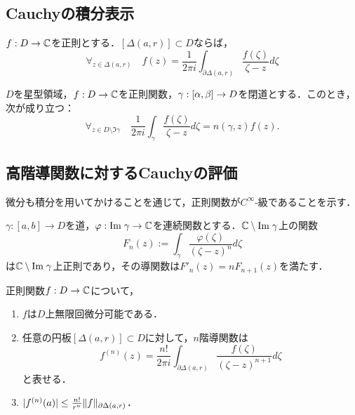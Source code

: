 \documentclass[uplatex, dvipdfmx]{jsreport}
\begin{document}
\subsection{Cauchyの積分表示}

\begin{theorem}[閉円板に対するCauchyの積分表示]
    $f:D\to\mathbb{C}$を正則とする．$[\Delta(a,r)]\subset D$ならば，
    \[\forall_{z\in\Delta(a,r)}\quad f(z)=\frac{1}{2\pi i}\int_{\partial\Delta(a,r)}\frac{f(\zeta)}{\zeta-z}d\zeta\]
\end{theorem}

\begin{theorem}[一般の曲線に対するCauchyの積分表示]
    $D$を星型領域，$f:D\to\mathbb{C}$を正則関数，$\gamma:[\alpha,\beta]\to D$を閉道とする．このとき，次が成り立つ：
    \[\forall_{z\in D\setminus\Im\gamma}\quad\frac{1}{2\pi i}\int_\gamma\frac{f(\zeta)}{\zeta-z}d\zeta=n(\gamma,z)f(z).\]
\end{theorem}

\subsection{高階導関数に対するCauchyの評価}

\begin{tcolorbox}[colframe=ForestGreen, colback=ForestGreen!10!white,breakable,colbacktitle=ForestGreen!40!white,coltitle=black,fonttitle=\bfseries\sffamily,
title=]
    微分も積分を用いてかけることを通じて，正則関数が$C^\infty$-級であることを示す．
\end{tcolorbox}

\begin{lemma}
    $\gamma:[a,b]\to D$を道，$\varphi:\mathrm{Im}\;\gamma\to\mathbb{C}$を連続関数とする．$\mathbb{C}\setminus\mathrm{Im}\;\gamma$上の関数
    \[F_n(z):=\int_\gamma\frac{\varphi(\zeta)}{(\zeta-z)^n}d\zeta\]
    は$\mathbb{C}\setminus\mathrm{Im}\;\gamma$上正則であり，その導関数は$F'_n(z)=nF_{n+1}(z)$を満たす．
\end{lemma}

\begin{theorem}
    正則関数$f:D\to\mathbb{C}$について，
    \begin{enumerate}
        \item $f$は$D$上無限回微分可能である．
        \item 任意の円板$[\Delta(a,r)]\subset D$に対して，$n$階導関数は
        \[f^{(n)}(z)=\frac{n!}{2\pi i}\int_{\partial\Delta(a,r)}\frac{f(\zeta)}{(\zeta-z)^{n+1}}d\zeta\]
        と表せる．
        \item $\lvert f^{(n)}(a)\rvert\le\frac{n!}{r^n}\|f\|_{\partial\Delta(a,r)}$．
    \end{enumerate}
\end{theorem}
\end{document}
